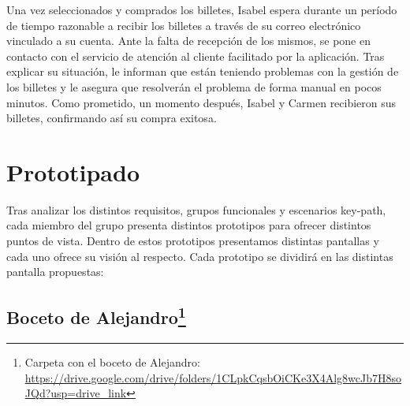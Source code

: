 Una vez seleccionados y comprados los billetes, Isabel espera durante un
período de tiempo razonable a recibir los billetes a través de su correo
electrónico vinculado a su cuenta. Ante la falta de recepción de los mismos, se
pone en contacto con el servicio de atención al cliente facilitado por la
aplicación. Tras explicar su situación, le informan que están teniendo
problemas con la gestión de los billetes y le asegura que resolverán el
problema de forma manual en pocos minutos. Como prometido, un momento después,
Isabel y Carmen recibieron sus billetes, confirmando así su compra exitosa.

\section{Prototipado}

Tras analizar los distintos requisitos, grupos funcionales y escenarios
key-path, cada miembro del grupo presenta distintos prototipos para ofrecer
distintos puntos de vista. Dentro de estos prototipos presentamos distintas
pantallas y cada uno ofrece su visión al respecto. Cada prototipo se dividirá
en las distintas pantalla propuestas:

\subsection[Boceto de Alejandro]{Boceto de Alejandro\footnote{Carpeta con el boceto de Alejandro: \url{https://drive.google.com/drive/folders/1CLpkCqsbOiCKe3X4Alg8wcJb7H8soJQd?usp=drive_link}}}

